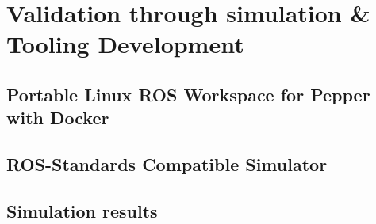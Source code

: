 
\chapter{Validation through simulation \& Tooling Development} %

\label{Chapter5} %

\section{Portable Linux ROS Workspace for Pepper with Docker}


\section{ROS-Standards Compatible Simulator}


\section{Simulation results}
